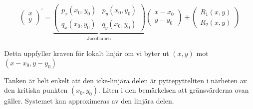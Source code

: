 \begin{equation*}
  \begin{gathered}
    \begin{pmatrix}x\\y\end{pmatrix}^{\prime} = \underbrace{\begin{pmatrix}p_x(x_0,y_0)&p_y(x_0,y_0)\\q_x(x_0,y_0)&q_y(x_0,y_0)\end{pmatrix}}_{\text{Jacobianen}}\begin{pmatrix}x-x_0\\y-y_0\end{pmatrix}+\begin{pmatrix}R_1(x,y)\\R_2(x,y)\end{pmatrix}
  \end{gathered}
\end{equation*}
\par\bigskip
\noindent Detta uppfyller kraven för lokalt linjär om vi byter ut $(x,y)$ mot $(x-x_0,y-y_0)$
\par\bigskip
\noindent Tanken är helt enkelt att den icke-linjära delen är pyttepytteliten i närheten av den kritiska punkten $(x_0,y_0)$. Liten i den bemärkelsen att gränsvärderna ovan gäller. Systemet kan approximeras av den linjära delen.

